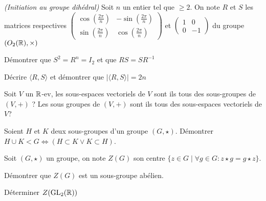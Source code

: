 \documentclass{report}
\begin{document}
\begin{exo} \textit{(Initiation au groupe dihédral)}
    Soit \(n\) un entier tel que \(\geq 2\). On note \(R\) et \(S\) les matrices
    respectives \(\begin{pmatrix}
        \cos(\frac{2\pi}{n}) & -\sin(\frac{2\pi}{n}) \\
        \sin(\frac{2\pi}{n}) & \cos(\frac{2\pi}{n})
    \end{pmatrix}\) et \(\begin{pmatrix}1 & 0 \\ 0 & -1\end{pmatrix}\)
    du groupe \(\left(O_2(\mathbb{R}), \times\right)\)
    \begin{q}{1}
        Démontrer que \(S^2=R^n=I_2\) et que \(RS=SR^{-1}\)
    \end{q}
    \begin{q}{2}
        Décrire \(\langle R,S\rangle\) et démontrer que \(|\langle R,S\rangle|=2n\)
    \end{q}
\end{exo}

\begin{exo}
    Soit \(V\) un \(\mathbb{R}\)-ev, les sous-espaces vectoriels de \(V\) sont ils tous des
    sous-groupes de \(\left(V,+\right)\) ? Les sous groupes de \(\left(V,+\right)\)
    sont ils tous des sous-espaces vectoriels de \(V\)?
\end{exo}

\begin{exo}
    Soient \(H\) et \(K\) deux sous-groupes d'un groupe \(\left(G,\star\right)\).
    Démontrer \(H\cup K<G\Leftrightarrow (H\subset K \lor K\subset H)\).
\end{exo}

\begin{exo}
    Soit \(\left(G,\star\right)\) un groupe, on note \(Z(G)\) son centre
    \(\{z\in G\mid \forall g\in G : z\star g = g\star z\}\).
    \begin{q}{1}
        Démontrer que \(Z(G)\) est un sous-groupe abélien.
    \end{q}
    \begin{q}{2}
        Déterminer \(Z(\textrm{GL}_2(\mathbb{R}))\)
    \end{q}
\end{exo}
\end{document}
